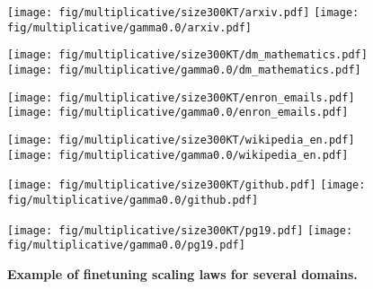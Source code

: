 \begin{figure*}%
    \centering
    \begin{minipage}{0.49\textwidth}
        \texttt{[image: fig/multiplicative/size300KT/arxiv.pdf]}
        \texttt{[image: fig/multiplicative/gamma0.0/arxiv.pdf]}
    \end{minipage}
    \begin{minipage}{0.49\textwidth}
        \texttt{[image: fig/multiplicative/size300KT/dm\_mathematics.pdf]}
        \texttt{[image: fig/multiplicative/gamma0.0/dm\_mathematics.pdf]}
    \end{minipage}
    \begin{minipage}{0.49\textwidth}
        \texttt{[image: fig/multiplicative/size300KT/enron\_emails.pdf]}
        \texttt{[image: fig/multiplicative/gamma0.0/enron\_emails.pdf]}
    \end{minipage}
    \begin{minipage}{0.49\textwidth}%
        \texttt{[image: fig/multiplicative/size300KT/wikipedia\_en.pdf]}
        \texttt{[image: fig/multiplicative/gamma0.0/wikipedia\_en.pdf]}
    \end{minipage}
    \begin{minipage}{0.49\textwidth}
        \texttt{[image: fig/multiplicative/size300KT/github.pdf]}
        \texttt{[image: fig/multiplicative/gamma0.0/github.pdf]}
    \end{minipage}
    \begin{minipage}{0.49\textwidth}
        \texttt{[image: fig/multiplicative/size300KT/pg19.pdf]}
        \texttt{[image: fig/multiplicative/gamma0.0/pg19.pdf]}
    \end{minipage}
    \caption{\textbf{Example of finetuning scaling laws for several domains.}}
    \label{fig:multiplicativegrid}
\end{figure*}

